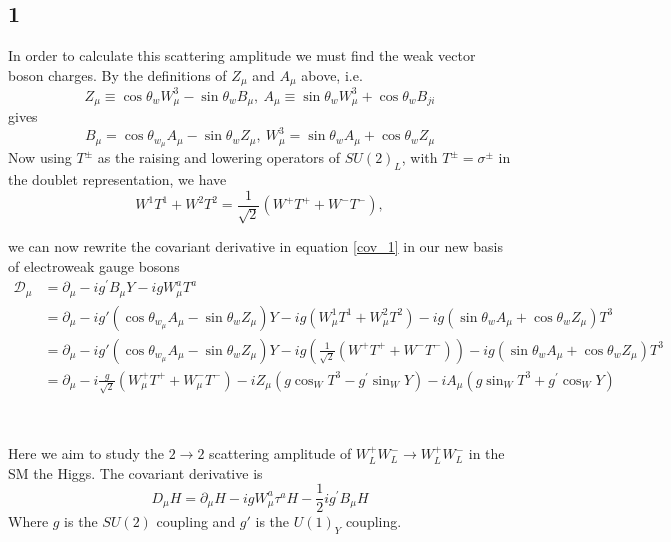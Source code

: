 \documentclass[11pt]{article}
\begin{document}
{\subsection{1}
In order to calculate this scattering amplitude we must find the weak vector boson charges. By the definitions of $Z_\mu$ and $A_\mu$ above, i.e.
\begin{equation}
    Z_{\mu} \equiv \cos \theta_{w} W_{\mu}^{3}-\sin \theta_{w} B_{\mu} , \ A_{\mu} \equiv \sin \theta_{w} W_{\mu}^{3}+\cos \theta_{w} B_{j i}
\end{equation}
gives 
\begin{equation}
    B_{\mu}=\cos \theta_{w_{\mu}} A_{\mu}-\sin \theta_{w} Z_{\mu}, \ W_{\mu}^{3}=\sin \theta_{w} A_{\mu}+\cos \theta_{w} Z_{\mu}
\end{equation}
Now using $T^{\pm}$ as the raising and lowering operators of $SU(2)_L$, with $T^{\pm}=\sigma^{\pm}$ in the doublet representation, we have
\begin{equation}
    W^{1} T^{1}+W^{2} T^{2}=\frac{1}{\sqrt{2}}\left(W^{+} T^{+}+W^{-} T^{-}\right),
\end{equation}

we can now rewrite the covariant derivative in equation \ref{cov_1} in our new basis of electroweak gauge bosons
\begin{equation}
    \begin{aligned}
    \mathcal{D}_{\mu} &=\partial_{\mu}-i g^{\prime} B_{\mu} Y-i g W_{\mu}^{a} T^{a} \\
            &= \partial_\mu -i g' (\cos \theta_{w_{\mu}} A_{\mu}-\sin \theta_{w} Z_{\mu})  Y -ig(W_\mu^1 T^1 +W_\mu^2 T^2) -ig(\sin \theta_{w} A_{\mu}+\cos \theta_{w} Z_{\mu}) T^3 \\
             &= \partial_\mu -i g' (\cos \theta_{w_{\mu}} A_{\mu}-\sin \theta_{w} Z_{\mu})  Y -ig(\frac{1}{\sqrt{2}}\left(W^{+} T^{+}+W^{-} T^{-}\right)) -ig(\sin \theta_{w} A_{\mu}+\cos \theta_{w} Z_{\mu}) T^3 \\
             &=\partial_{\mu}-i \frac{g}{\sqrt{2}}\left(W_{\mu}^{+} T^{+}+W_{\mu}^{-} T^{-}\right)-i Z_{\mu}\left(g \cos_{W} T^{3}-g^{\prime} \sin_{W} Y\right)-i A_{\mu}\left(g \sin_{W} T^{3}+g^{\prime} \cos_{W} Y\right)
             
    \end{aligned}
\end{equation}

\\
\newpage




Here we aim to study the $2 \rightarrow 2$ scattering amplitude of $W_{L}^{+} W_{L}^{-} \rightarrow W_{L}^{+} W_{L}^{-}$ in the SM  the Higgs. The covariant derivative is
\begin{equation}
    D_{\mu} H=\partial_{\mu} H-i g W_{\mu}^{a} \tau^{a} H-\frac{1}{2} i g^{\prime} B_{\mu} H
\end{equation}
Where $g$ is the $SU(2)$ coupling and $g'$ is the $U(1)_Y$ coupling.

}
\end{document}
